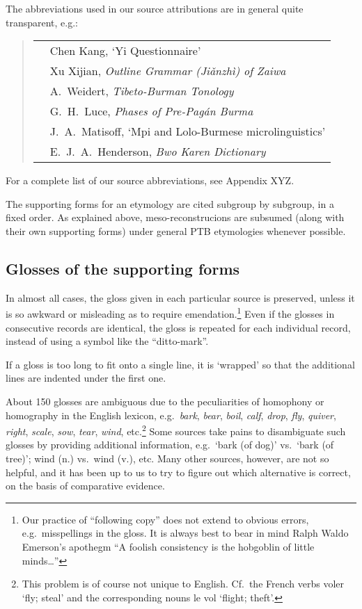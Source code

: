The abbreviations used in our source attributions are in general quite
transparent, e.g.:

\begin{quote}
\begin{tabular}{ll}
\citealt{CK-YiQ}	&Chen Kang, ‘Yi Questionnaire’\\
\citealt{JZ-Zaiwa}	&Xu Xijian, \textit{Outline Grammar (Jiǎnzhì) of Zaiwa}\\
\citealt{AW-TBT}	&A.~Weidert, \textit{Tibeto-Burman Tonology}\\
\citealt{GHL-PPB}	&G.~H.~Luce, \textit{Phases of Pre-Pag\'an Burma}\\
\citealt{JAM:MLBM}	&J.~A.~Matisoff, ‘Mpi and Lolo-Burmese microlinguistics’\\
\citealt{EJAH:BKD}	&E.~J.~A.~Henderson, \textit{Bwo Karen Dictionary}\\
\end{tabular}
\end{quote}

For a complete list of our source abbreviations, see Appendix XYZ.

The supporting forms for an etymology are cited subgroup by subgroup, in a fixed order. As explained above, meso-reconstrucions are subsumed (along with their own supporting forms) under general PTB etymologies whenever possible.

\subsection{Glosses of the supporting forms}

In almost all cases, the gloss given in each particular source is preserved,
unless it is so awkward or misleading as to require emendation.\footnote{Our practice of “following copy” does not extend to obvious errors, e.g.\ misspellings in the gloss. It is always best to bear in mind Ralph Waldo Emerson’s apothegm “A foolish consistency is the hobgoblin of little minds…”} Even if the
glosses in consecutive records are identical, the gloss is repeated for each
individual record, instead of using a symbol like the “ditto-mark”.

If a gloss is too long to fit onto a single line, it is ‘wrapped’ so that
the additional lines are indented under the first one.


About 150 glosses are ambiguous due to the peculiarities of homophony or homography in the English lexicon, e.g.\ \textit{bark}, \textit{bear}, \textit{boil}, \textit{calf}, \textit{drop}, \textit{fly}, \textit{quiver}, \textit{right}, \textit{scale}, \textit{sow}, \textit{tear}, \textit{wind}, etc.\footnote{This problem is of course not unique to English. Cf.\ the French verbs voler ‘fly; steal’ and the corresponding nouns le vol ‘flight; theft’.} Some sources take pains to disambiguate such glosses by providing additional information, e.g.\ ‘bark (of dog)’ vs.\ ‘bark (of tree)’; wind (n.) vs.\ wind (v.), etc. Many other sources, however, are not so helpful, and it has been up to us to try to figure out which alternative is correct, on the basis of comparative evidence.

